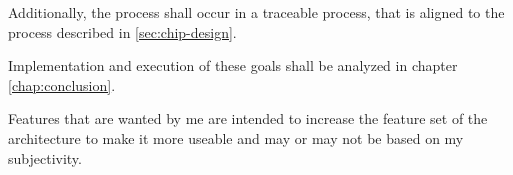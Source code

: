 Additionally, the process shall occur in a traceable process, that is aligned to the process described in \ref{sec:chip-design}.

Implementation and execution of these goals shall be analyzed in chapter \ref{chap:conclusion}.

Features that are wanted by me are intended to increase the feature set of the architecture to make it more useable and may or may not be based on my subjectivity.